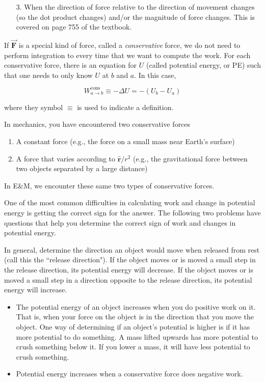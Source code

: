 \documentclass{article}
\newcommand{\rhat}[0]{\hat{\mathbf{r}}}
\newcommand{\bfvec}[1]{\vec{\mathbf{#1}}}
\begin{document}
\begin{enumerate}

  \item[3.] When the direction of force relative to the direction of movement changes (so the dot product changes) and/or the magnitude of force changes. This is covered on page 755 of the textbook.

\end{enumerate}

If $\bfvec{F}$ is a special kind of force, called a \emph{conservative} force, we do not need to perform integration to every time that we want to compute the work. For each conservative force, there is an equation for $U$ (called potential energy, or PE) such that one needs to only know $U$ at $b$ and $a$. In this case,

$$
W_{a\rightarrow b}^{\text{cons}} \equiv -\Delta U = -(U_b-U_a)
$$

where they symbol $\equiv$ is used to indicate a definition.

In mechanics, you have encountered two conservative forces

\begin{enumerate}

  \item A constant force (e.g., the force on a small mass near Earth's surface)

  \item A force that varies according to $\rhat/r^2$ (e.g., the gravitational force between two objects separated by a large distance)

\end{enumerate}

In E&M, we encounter these same two types of conservative forces.

One of the most common difficulties in calculating work and change in potential energy is getting the correct sign for the answer. The following two problems have questions that help you determine the correct sign of work and changes in potential energy.

In general, determine the direction an object would move when released from rest (call this the ``release direction"). If the object moves or is moved a small step in the release direction, its potential energy will decrease. If the object moves or is moved a small step in a direction opposite to the release direction, its potential energy will increase.

\begin{itemize}

  \item The potential energy of an object increases when you do positive work on it. That is, when your force on the object is in the direction that you move the object. One way of determining if an object's potential is higher is if it has more potential to do something. A mass lifted upwards has more potential to crush something below it. If you lower a mass, it will have less potential to crush something.

  \item Potential energy increases when a conservative force does negative work.

\end{itemize}
\end{document}
